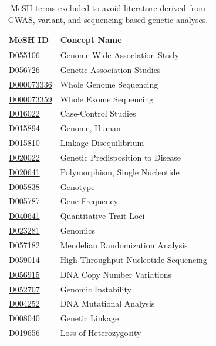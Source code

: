 \begin{table}[h]
\centering
\begin{tabular}{ll}
\toprule
\textbf{MeSH ID} & \textbf{Concept Name} \\
\midrule
\href{https://meshb.nlm.nih.gov/record/ui?ui=D055106}{D055106} & Genome-Wide Association Study \\
\href{https://meshb.nlm.nih.gov/record/ui?ui=D056726}{D056726} & Genetic Association Studies \\
\href{https://meshb.nlm.nih.gov/record/ui?ui=D000073336}{D000073336} & Whole Genome Sequencing \\
\href{https://meshb.nlm.nih.gov/record/ui?ui=D000073359}{D000073359} & Whole Exome Sequencing \\
\href{https://meshb.nlm.nih.gov/record/ui?ui=D016022}{D016022} & Case-Control Studies \\
\href{https://meshb.nlm.nih.gov/record/ui?ui=D015894}{D015894} & Genome, Human \\
\href{https://meshb.nlm.nih.gov/record/ui?ui=D015810}{D015810} & Linkage Disequilibrium \\
\href{https://meshb.nlm.nih.gov/record/ui?ui=D020022}{D020022} & Genetic Predisposition to Disease \\
\href{https://meshb.nlm.nih.gov/record/ui?ui=D020641}{D020641} & Polymorphism, Single Nucleotide \\
\href{https://meshb.nlm.nih.gov/record/ui?ui=D005838}{D005838} & Genotype \\
\href{https://meshb.nlm.nih.gov/record/ui?ui=D005787}{D005787} & Gene Frequency \\
\href{https://meshb.nlm.nih.gov/record/ui?ui=D040641}{D040641} & Quantitative Trait Loci \\
\href{https://meshb.nlm.nih.gov/record/ui?ui=D023281}{D023281} & Genomics \\
\href{https://meshb.nlm.nih.gov/record/ui?ui=D057182}{D057182} & Mendelian Randomization Analysis \\
\href{https://meshb.nlm.nih.gov/record/ui?ui=D059014}{D059014} & High-Throughput Nucleotide Sequencing \\
\href{https://meshb.nlm.nih.gov/record/ui?ui=D056915}{D056915} & DNA Copy Number Variations \\
\href{https://meshb.nlm.nih.gov/record/ui?ui=D052707}{D052707} & Genomic Instability \\
\href{https://meshb.nlm.nih.gov/record/ui?ui=D004252}{D004252} & DNA Mutational Analysis \\
\href{https://meshb.nlm.nih.gov/record/ui?ui=D008040}{D008040} & Genetic Linkage \\
\href{https://meshb.nlm.nih.gov/record/ui?ui=D019656}{D019656} & Loss of Heterozygosity \\
\bottomrule
\end{tabular}
\caption{MeSH terms excluded to avoid literature derived from GWAS, variant, and sequencing-based genetic analyses.}
\label{tab:gwas-mesh-terms}
\end{table}